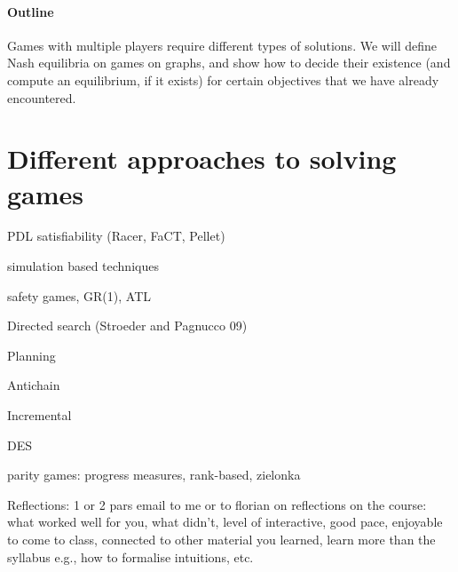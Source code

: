 \documentclass[a4paper,10pt]{article}
\begin{document}
\paragraph{Outline} 
Games with multiple players require different types of solutions. We will define Nash equilibria on games on graphs, and show how to decide their existence (and compute an equilibrium, if it exists) for certain objectives that we have already encountered.

\section{Different approaches to solving games}

\en
\- PDL satisfiability (Racer, FaCT, Pellet)

\- simulation based techniques

\- safety games, GR(1), ATL

\- Directed search (Stroeder and Pagnucco 09)

\- Planning

\- Antichain

\- Incremental

\- DES

\- parity games: progress measures, rank-based, zielonka

\ne

Reflections: 1 or 2 pars email to me or to florian on reflections on the course: what worked well for you, what didn't, level of interactive, good pace, enjoyable to come to class, connected to other material you learned, learn more than the syllabus e.g., how to formalise intuitions, etc.
\end{document}
